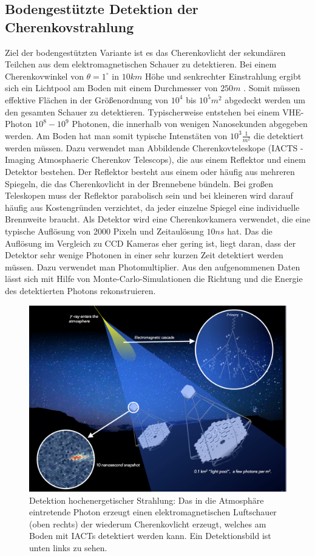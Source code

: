 \subsection{Bodengestützte Detektion der Cherenkovstrahlung}
Ziel der bodengestützten Variante ist es das Cherenkovlicht der sekundären Teilchen aus dem elektromagnetischen Schauer zu detektieren. Bei einem Cherenkovwinkel von $\theta=1^{\circ}$ in $10\unit{km}$ Höhe und senkrechter Einstrahlung ergibt sich ein Lichtpool am Boden mit einem Durchmesser von $250\unit{m}$ \cite{DesignConcept}. Somit müssen effektive Flächen in der Größenordnung von $10^4$ bis $10^5\unit{m^2}$ abgedeckt werden um den gesamten Schauer zu detektieren. Typischerweise entstehen bei einem VHE-Photon $10^8-10^9$ Photonen, die innerhalb von wenigen Nanosekunden abgegeben werden. Am Boden hat man somit typische Intenstäten von $10^3\unit{\frac{1}{m^2}}$ die detektiert werden müssen.
Dazu verwendet man Abbildende Cherenkovteleskope (IACTS - Imaging Atmosphaeric Cherenkov Telescops), die aus einem Reflektor und einem Detektor bestehen. Der Reflektor besteht aus einem oder häufig aus mehreren Spiegeln, die das Cherenkovlicht in der Brennebene bündeln. Bei großen Teleskopen muss der Reflektor parabolisch sein und bei kleineren wird darauf häufig aus Kostengründen verzichtet, da jeder einzelne Spiegel eine individuelle Brennweite braucht.
Als Detektor wird eine Cherenkovkamera verwendet, die eine typische Auflösung von 2000 Pixeln und Zeitaulösung $10\unit{ns}$\cite{CherenkovCam} hat. Das die Auflösung im Vergleich zu CCD Kameras eher gering ist, liegt daran, dass der Detektor sehr wenige Photonen in einer sehr kurzen Zeit detektiert werden müssen. Dazu verwendet man Photomultiplier.
Aus den aufgenommenen Daten lässt sich mit Hilfe von Monte-Carlo-Simulationen die Richtung und die Energie des detektierten Photons rekonstruieren. 

\begin{figure}[htbp]
\centering
\includegraphics[width=\textwidth]{Images/detection.png}
\caption{Detektion hochenergetischer Strahlung: Das in die Atmosphäre eintretende Photon erzeugt einen elektromagnetischen Luftschauer (oben rechts) der wiederum Cherenkovlicht erzeugt, welches am Boden mit IACTs detektiert werden kann. Ein Detektionsbild ist unten links zu sehen.}
\label{img:detection}
\end{figure}
